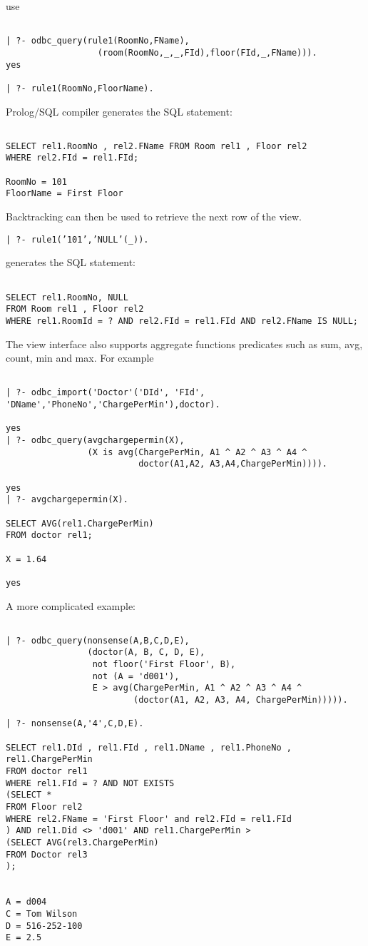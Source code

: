 use

\begin{verbatim}

| ?- odbc_query(rule1(RoomNo,FName),
                  (room(RoomNo,_,_,FId),floor(FId,_,FName))).
yes

| ?- rule1(RoomNo,FloorName).
\end{verbatim}

Prolog/SQL compiler generates the SQL statement:
\begin{verbatim}

SELECT rel1.RoomNo , rel2.FName FROM Room rel1 , Floor rel2 
WHERE rel2.FId = rel1.FId;

RoomNo = 101
FloorName = First Floor
\end{verbatim}

Backtracking can then be used to retrieve the next row of the view.
\begin{center}

{\tt | ?- rule1('101','NULL'(\_)).}
\end{center}

generates the SQL statement:
\begin{verbatim}

SELECT rel1.RoomNo, NULL
FROM Room rel1 , Floor rel2
WHERE rel1.RoomId = ? AND rel2.FId = rel1.FId AND rel2.FName IS NULL;
\end{verbatim}

The view interface also supports aggregate functions predicates such as sum, avg,
count, min and max.  For example
\begin{verbatim}

| ?- odbc_import('Doctor'('DId', 'FId', 'DName','PhoneNo','ChargePerMin'),doctor).

yes
| ?- odbc_query(avgchargepermin(X),
                (X is avg(ChargePerMin, A1 ^ A2 ^ A3 ^ A4 ^ 
                          doctor(A1,A2, A3,A4,ChargePerMin)))).

yes
| ?- avgchargepermin(X).

SELECT AVG(rel1.ChargePerMin)
FROM doctor rel1;

X = 1.64

yes
\end{verbatim}


A more complicated example:
\begin{verbatim}

| ?- odbc_query(nonsense(A,B,C,D,E),
                (doctor(A, B, C, D, E), 
                 not floor('First Floor', B), 
                 not (A = 'd001'), 
                 E > avg(ChargePerMin, A1 ^ A2 ^ A3 ^ A4 ^
                         (doctor(A1, A2, A3, A4, ChargePerMin))))).

| ?- nonsense(A,'4',C,D,E).

SELECT rel1.DId , rel1.FId , rel1.DName , rel1.PhoneNo , rel1.ChargePerMin
FROM doctor rel1
WHERE rel1.FId = ? AND NOT EXISTS
(SELECT *
FROM Floor rel2
WHERE rel2.FName = 'First Floor' and rel2.FId = rel1.FId
) AND rel1.Did <> 'd001' AND rel1.ChargePerMin >
(SELECT AVG(rel3.ChargePerMin)
FROM Doctor rel3
);


A = d004
C = Tom Wilson
D = 516-252-100
E = 2.5
\end{verbatim}

